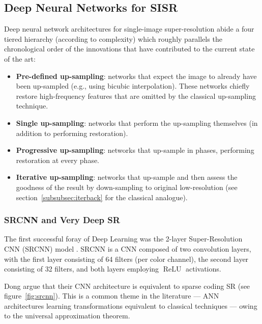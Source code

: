 \subsection{Deep Neural Networks for SISR}
Deep neural network architectures for single-image super-resolution abide a four tiered hierarchy (according to complexity) which roughly parallels the chronological order of the innovations that have contributed to the current state of the art:
\begin{framed}
    \begin{itemize}
        \item \textbf{Pre-defined up-sampling}: networks that expect the image to already have been up-sampled (e.g., using bicubic interpolation). These networks chiefly restore high-frequency features that are omitted by the classical up-sampling technique.
        \item \textbf{Single up-sampling}: networks that perform the up-sampling themselves (in addition to performing restoration).
        \item \textbf{Progressive up-sampling}: networks that up-sample in phases, performing restoration at every phase.
        \item \textbf{Iterative up-sampling}: networks that up-sample and then assess the goodness of the result by down-sampling to original low-resolution (see section~\ref{subsubsec:iterback} for the classical analogue).
    \end{itemize}
\end{framed}
\subsubsection{SRCNN and Very Deep SR}\label{subsubsec:vdsr}
The first successful foray of Deep Learning was the 2-layer Super-Resolution CNN (SRCNN) model \cite{Dong_2016}.
%
SRCNN is a CNN composed of two convolution layers, with the first layer consisting of 64 filters (per color channel), the second layer consisting of 32 filters, and both layers employing \(\operatorname{ReLU}\) activations.
%

Dong \etal argue that their CNN architecture is equivalent to sparse coding SR (see figure~\ref{fig:srcnn}).
%
This is a common theme in the literature --- ANN architectures learning transformations equivalent to classical techniques --- owing to the universal approximation theorem.

